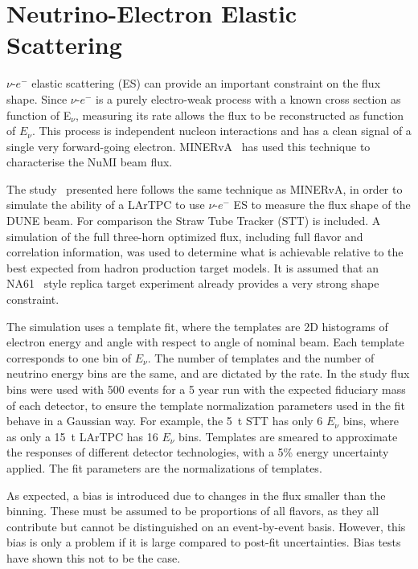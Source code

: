 \documentclass[a4paper]{article}
\begin{document}
\section{Neutrino-Electron Elastic Scattering}

$\nu$-$e^-$ elastic scattering (ES) can provide an important constraint on the flux shape. 
Since $\nu$-$e^-$ is a purely electro-weak process with a known cross section as function of E$_{\nu}$, measuring its rate allows the flux to be reconstructed as function of $E_{\nu}$. 
This process is independent nucleon interactions and has a clean signal of a single very forward-going electron. 
MINERvA~\cite{minerva} has used this technique to characterise the NuMI beam flux. 

The study~\cite{flux} presented here follows the same technique as MINERvA, in order to simulate the ability of a LArTPC to use $\nu$-$e^-$ ES to measure the flux shape of the DUNE beam.
For comparison the Straw Tube Tracker (STT) is included. 
A simulation of the full three-horn optimized flux, including full flavor and correlation information, was used to determine what is achievable relative to the best expected from hadron production target models. 
It is assumed that an NA61~\cite{na61} style replica target experiment already provides a very strong shape constraint. 

The simulation uses a template fit, where the templates are 2D histograms of electron energy and angle with respect to angle of nominal beam. 
Each template corresponds to one bin of $E_\nu$. 
The number of templates and the number of neutrino energy bins are the same, and are dictated by the rate. 
In the study flux bins were used with 500 events for a 5 year run with the expected fiduciary mass of each detector, to ensure the template normalization parameters used in the fit behave in a Gaussian way.  
For example, the 5~t STT has only 6 $E_\nu$ bins, where as only a 15~t LArTPC has 16 $E_\nu$ bins. 
Templates are smeared to approximate the responses of different detector technologies, with a 5\% energy uncertainty applied. 
The fit parameters are the normalizations of templates.

As expected, a bias is introduced due to changes in the flux smaller than the binning. 
These must be assumed to be proportions of all flavors, as they all contribute but cannot be distinguished on an event-by-event basis. 
However, this bias is only a problem if it is large compared to post-fit uncertainties. Bias tests have shown this not to be the case. 
\end{document}
